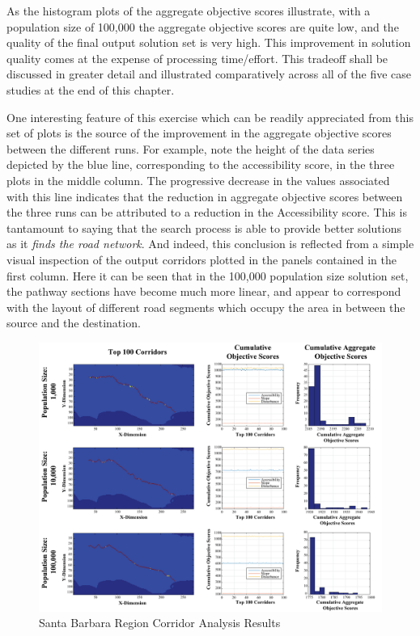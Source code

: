 As the histogram plots of the aggregate objective scores illustrate, with a population size of 100,000 the aggregate objective scores are quite low, and the quality of the final output solution set is very high. This improvement in solution quality comes at the expense of processing time/effort. This tradeoff shall be discussed in greater detail and illustrated comparatively across all of the five case studies at the end of this chapter. 

One interesting feature of this exercise which can be readily appreciated from this set of plots is the source of the improvement in the aggregate objective scores between the different runs. For example, note the height of the data series depicted by the blue line, corresponding to the accessibility score, in the three plots in the middle column. The progressive decrease in the values associated with this line indicates that the reduction in aggregate objective scores between the three runs can be attributed to a reduction in the Accessibility score. This is tantamount to saying that the search process is able to provide better solutions as it \textit{finds the road network}. And indeed, this conclusion is reflected from a simple visual inspection of the output corridors plotted in the panels contained in the first column. Here it can be seen that in the 100,000 population size solution set, the pathway sections have become much more linear, and appear to correspond with the layout of different road segments which occupy the area in between the source and the destination. 
    
        \begin{figure}[!h]
            \begin{center}
            \includegraphics[width=6in]{figures/SantaBarbara_PathwayResults.png}   
            \caption{Santa Barbara Region Corridor Analysis Results}
            \label{fig:SBresults}
            \end{center}
        \end{figure}
        
